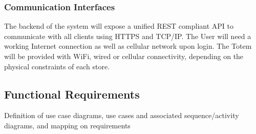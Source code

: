 \subsubsection{Communication Interfaces}
The backend of the system will expose a unified REST compliant API to communicate with all clients using HTTPS and TCP/IP.
The User will need a working Internet connection as well as cellular network upon login.
The Totem will be provided with WiFi, wired or cellular connectivity, depending on the physical constraints of each store.

\subsection{Functional Requirements}
Definition of use case diagrams, use cases and associated
sequence/activity diagrams, and mapping on requirements

